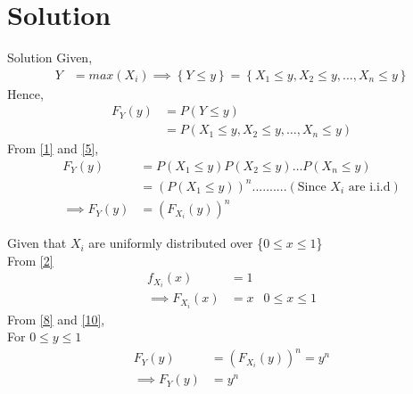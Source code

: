\documentclass{beamer}
\providecommand{\cbrak}[1]{\ensuremath{\left\{#1\right\}}}
\begin{document}
\section{Solution}
\begin{frame}{Solution}
    Given,
    \begin{align}
        Y&= max(X_i)
        \implies \cbrak{Y \leq y} = \cbrak{X_1 \leq y,X_2 \leq y,\dots, X_n \leq y}
    \end{align}
Hence,
\begin{align}
    F_Y(y) &= P(Y \leq y)\\
            &= P(X_1 \leq y,X_2 \leq y,\dots, X_n \leq y) \label{5}
\end{align}
From \eqref{1} and \eqref{5},
\begin{align}
    F_Y(y)&=P(X_1 \leq y) P(X_2 \leq y) \dots  P(X_n \leq y)\\
    &=(P(X_1 \leq y))^n.......... (\text{Since } X_i \text{ are i.i.d})\\
    \implies F_Y(y) &=(F_{X_i}(y))^n \label{8}
\end{align}
\end{frame}

\begin{frame}{}
Given that $X_i$ are uniformly distributed over \{$0 \leq x \leq 1$\}\\
    From \eqref{2}
    \begin{align}
        f_{X_i}(x) &= 1 \\
        \implies F_{X_i}(x) &= x  & 0\leq x \leq 1
        \label{10}
    \end{align}
From \eqref{8} and \eqref{10},\\
For $ 0 \leq y \leq 1 $
\begin{align}
    F_Y(y) &=(F_{X_i}(y))^n=y^n\\
    \implies F_Y(y) &= y^n
\end{align}
\end{frame}
\end{document}
